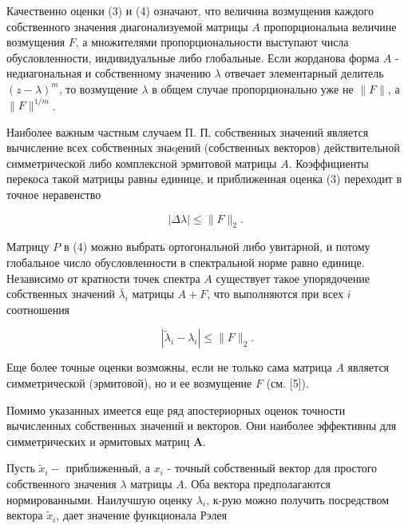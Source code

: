 \documentclass[10pt]{article}
\begin{document}
Качественно оценки (3) и (4) означают, что величина возмущения каждого собственного значения диагонализуемой матрицы $A$ пропорциональна величине возмущения $F$, а множителями пропорциональности выступают числа обусловленности, индивидуальные либо глобальные. Если жорданова форма $A$ - недиагональная и собственному значению $\lambda$ отвечает элементарный делитель $(z-\lambda)^{m}$, то возмущение $\lambda$ в общем случае пропорционально уже не $\|F\|$, а $\|F\|^{1 / m}$.



Наиболее важным частным случаем П. П. собственных значений является вычисление всех собственных знаqений (собственных векторов) действительной симметрической либо комплексной эрмитовой матрицы $A$. Коэффициенты перекоса такой матрицы равны единице, и приближенная оценка (3) переходит в точное неравенство



\[

|\Delta \lambda| \leqslant\|F\|_{2} \text {. }

\]



Матрицу $P$ в (4) можно выбрать ортогональной либо увитарной, и потому глобальное число обусловленности в спектральной норме равно единице. Независимо от кратности точек спектра $A$ существует такое упорядочение собственных значений $\bar{\lambda}_{i}$ матрицы $A+F$, что выполняются при всех $i$ соотношения



\[

\left|\tilde{\lambda}_{i}-\lambda_{i}\right| \leqslant\|F\|_{2} .

\]



Еще более точные оценки возможны, если не только сама матрица $A$ является симметрической (эрмитовой), но и ее возмущение $F$ (см. [5]).



Помимо указанных имеется еще ряд апостериорных оценок точности вычисленных собственных значений и векторов. Они наиболее эффективны для симметрических и әрмитовых матриц $\boldsymbol{A}$.



Пусть $\tilde{x}_{i}-$ приближенный, а $x_{i}$ - точный собственный вектор для простого собственного значения $\lambda$ матрицы $A$. Оба вектора предполагаются нормированными. Наилучшую оценку $\lambda_{i}$, к-рую можно получить посредством вектора $\tilde{x}_{i}$, дает значение функционала Рэлея
\end{document}
